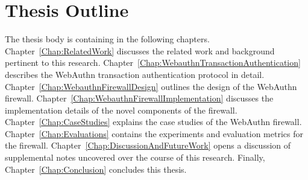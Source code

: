 




\section{Thesis Outline}

The thesis body is containing in the following chapters. Chapter~\ref{Chap:RelatedWork} discusses the related work and background pertinent to this research. Chapter~\ref{Chap:WebauthnTransactionAuthentication} describes the WebAuthn transaction authentication protocol in detail. Chapter~\ref{Chap:WebauthnFirewallDesign} outlines the design of the WebAuthn firewall. Chapter~\ref{Chap:WebauthnFirewallImplementation} discusses the implementation details of the novel components of the firewall. Chapter~\ref{Chap:CaseStudies} explains the case studies of the WebAuthn firewall. Chapter~\ref{Chap:Evaluations} contains the experiments and evaluation metrics for the firewall. Chapter~\ref{Chap:DiscussionAndFutureWork} opens a discussion of supplemental notes uncovered over the course of this research. Finally, Chapter~\ref{Chap:Conclusion} concludes this thesis.
